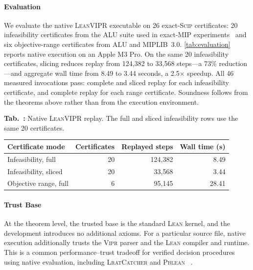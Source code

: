 \documentclass{article}
\newcommand{\tool}{\textsc{LeanVIPR}}
\newcommand{\scip}{\textsc{Scip}}
\newcommand{\vipr}{\textsc{Vipr}}
\newcommand{\lean}{\textsc{Lean}}
\renewcommand{\tablename}{Tab.}
\begin{document}
\paragraph{Evaluation}

We evaluate the native \tool{} executable on 26 exact-\scip{} certificates:
20 infeasibility certificates from the ALU suite used in exact-MIP
experiments~\citep{eifler2023computational} and six objective-range
certificates from ALU and MIPLIB~3.0. \autoref{tab:evaluation} reports native
execution on an Apple M3 Pro. On the same 20 infeasibility certificates,
slicing reduces replay from 124,382 to 33,568 steps---a 73\% reduction---and
aggregate wall time from 8.49 to 3.44 seconds, a 2.5$\times$ speedup. All 46
measured invocations pass: complete and sliced replay for each infeasibility
certificate, and complete replay for each range certificate. Soundness follows
from the theorems above rather than from the execution environment.

\begin{center}
\begin{minipage}{0.94\linewidth}
\centering
{}
\label{tab:evaluation}
\small
\textbf{\tablename~\thetable:} Native \tool{} replay. The full and sliced
infeasibility rows use the same 20 certificates.
\par\smallskip
\setlength{\tabcolsep}{7pt}
\begin{tabular}{lrrr}
\toprule
Certificate mode & Certificates & Replayed steps & Wall time (s) \\
\midrule
Infeasibility, full   & 20 & 124,382 & 8.49 \\
Infeasibility, sliced & 20 &  33,568 & 3.44 \\
Objective range, full &  6 &  95,145 & 28.41 \\
\bottomrule
\end{tabular}
\end{minipage}
\end{center}

\paragraph{Trust Base}

At the theorem level, the trusted base is the standard \lean{} kernel, and the
development introduces no additional axioms. For a particular source file,
native execution additionally trusts the \vipr{} parser and the \lean{}
compiler and runtime. This is a common performance--trust tradeoff for verified
decision procedures using native evaluation, including \textsc{LratCatcher}
and \textsc{Pblean}%
~\citep{szeider2026lrat,szeider2026pblean}.
\end{document}
